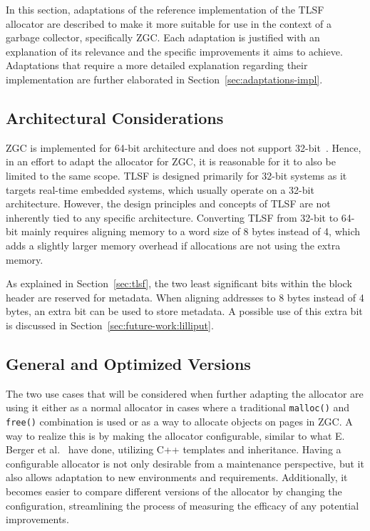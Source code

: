 
In this section, adaptations of the reference implementation of the TLSF allocator are described to make it more suitable for use in the context of a garbage collector, specifically ZGC. Each adaptation is justified with an explanation of its relevance and the specific improvements it aims to achieve. Adaptations that require a more detailed explanation regarding their implementation are further elaborated in Section~\ref{sec:adaptations-impl}.

\subsection{Architectural Considerations}
\label{sec:adaptations:architectural-considerations}

ZGC is implemented for 64-bit architecture and does not support 32-bit~\cite{zgc:deep_dive}. Hence, in an effort to adapt the allocator for ZGC, it is reasonable for it to also be limited to the same scope. TLSF is designed primarily for 32-bit systems as it targets real-time embedded systems, which usually operate on a 32-bit architecture. However, the design principles and concepts of TLSF are not inherently tied to any specific architecture. Converting TLSF from 32-bit to 64-bit mainly requires aligning memory to a word size of 8 bytes instead of 4, which adds a slightly larger memory overhead if allocations are not using the extra memory.

As explained in Section~\ref{sec:tlsf}, the two least significant bits within the block header are reserved for metadata. When aligning addresses to 8 bytes instead of 4 bytes, an extra bit can be used to store metadata. A possible use of this extra bit is discussed in Section~\ref{sec:future-work:lilliput}.

\subsection{General and Optimized Versions}

The two use cases that will be considered when further adapting the allocator are using it either as a normal allocator in cases where a traditional \texttt{malloc()} and \texttt{free()} combination is used or as a way to allocate objects on pages in ZGC. A way to realize this is by making the allocator configurable, similar to what E. Berger et al.~\cite{configurable_allocator} have done, utilizing C++ templates and inheritance. Having a configurable allocator is not only desirable from a maintenance perspective, but it also allows adaptation to new environments and requirements. Additionally, it becomes easier to compare different versions of the allocator by changing the configuration, streamlining the process of measuring the efficacy of any potential improvements.

